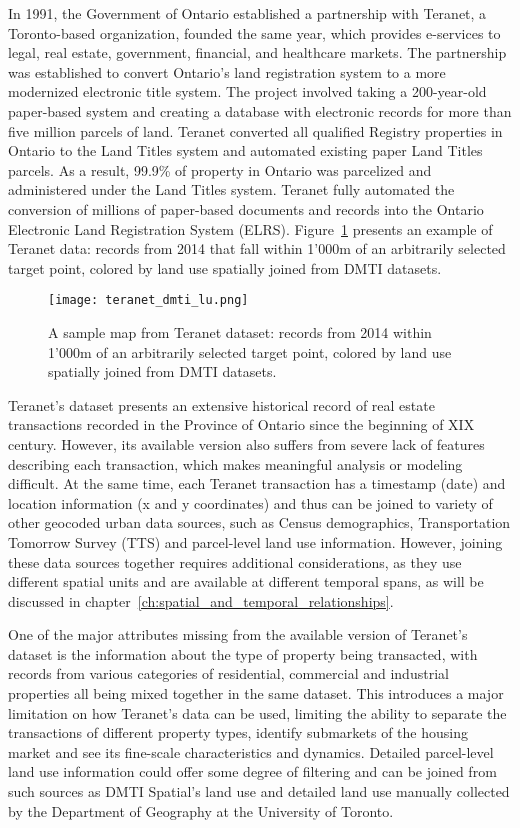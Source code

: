 In 1991, the Government of Ontario established a partnership with Teranet, a Toronto-based organization, founded the same year, which provides e-services to legal, real estate, government, financial, and healthcare markets.
The partnership was established to convert Ontario's land registration system to a more modernized electronic title system.
The project involved taking a 200-year-old paper-based system and creating a database with electronic records for more than five million parcels of land.
Teranet converted all qualified Registry properties in Ontario to the Land Titles system and automated existing paper Land Titles parcels.
As a result, 99.9\% of property in Ontario was parcelized and administered under the Land Titles system.
Teranet fully automated the conversion of millions of paper-based documents and records into the Ontario Electronic Land Registration System (ELRS)\cite{TeranetEnterprisesInc.2019}.
Figure~\ref{fig:teranet_dmti_lu} presents an example of Teranet data: records from 2014 that fall within 1'000m of an arbitrarily selected target point, colored by land use spatially joined from DMTI datasets.

\begin{figure}[hbt!]
    \centering
    \texttt{[image: teranet\_dmti\_lu.png]}
    \caption{A sample map from Teranet dataset: records from 2014 within 1'000m of an arbitrarily selected target point, colored by land use spatially joined from DMTI datasets.}
    \label{fig:teranet_dmti_lu}
\end{figure}

Teranet's dataset presents an extensive historical record of real estate transactions recorded in the Province of Ontario since the beginning of XIX century.
However, its available version also suffers from severe lack of features describing each transaction, which makes meaningful analysis or modeling difficult.
At the same time, each Teranet transaction has a timestamp (date) and location information (x and y coordinates) and thus can be joined to variety of other geocoded urban data sources, such as Census demographics, Transportation Tomorrow Survey (TTS) and parcel-level land use information.
However, joining these data sources together requires additional considerations, as they use different spatial units and are available at different temporal spans, as will be discussed in chapter~\ref{ch:spatial_and_temporal_relationships}.

One of the major attributes missing from the available version of Teranet's dataset is the information about the type of property being transacted, with records from various categories of residential, commercial and industrial properties all being mixed together in the same dataset.
This introduces a major limitation on how Teranet's data can be used, limiting the ability to separate the transactions of different property types, identify submarkets of the housing market and see its fine-scale characteristics and dynamics.
Detailed parcel-level land use information could offer some degree of filtering and can be joined from such sources as DMTI Spatial's land use and detailed land use manually collected by the Department of Geography at the University of Toronto.

